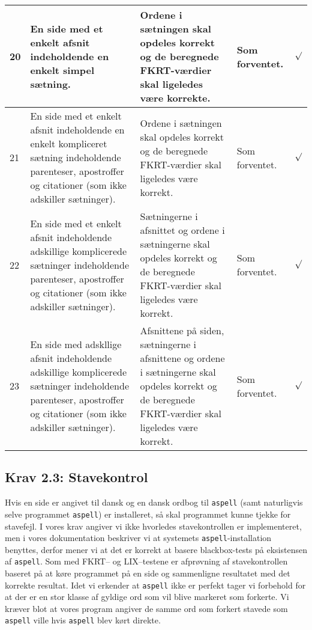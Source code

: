 \documentclass[a4paper,oneside,article]{memoir}
\begin{document}
\begin{landscape}
\begin{longtable}[c]{p{20pt}|p{220pt}|p{130pt}|p{130pt}|r}
20 & 
En side med et enkelt afsnit indeholdende en enkelt simpel sætning. &
Ordene i sætningen skal opdeles korrekt og de beregnede FKRT-værdier skal
ligeledes være korrekte. &
Som forventet. &
$\surd$ \\ \hline

21 & 
En side med et enkelt afsnit indeholdende en enkelt kompliceret
sætning indeholdende parenteser, apostroffer og citationer (som ikke
adskiller sætninger). &
Ordene i sætningen skal opdeles korrekt og de beregnede FKRT-værdier
skal ligeledes være korrekt. &
Som forventet. &
$\surd$ \\ \hline

22 &
En side med et enkelt afsnit indeholdende adskillige
komplicerede sætninger indeholdende parenteser, apostroffer og
citationer (som ikke adskiller sætninger). &
Sætningerne i afsnittet og ordene i sætningerne skal opdeles korrekt
og de beregnede FKRT-værdier skal ligeledes være korrekt. &
Som forventet. &
$\surd$ \\ \hline

23 &
En side med adskllige afsnit indeholdende adskillige
komplicerede sætninger indeholdende parenteser, apostroffer og
citationer (som ikke adskiller sætninger). &
Afsnittene på siden, sætningerne i afsnittene og ordene i sætningerne
skal opdeles korrekt og de beregnede FKRT-værdier skal ligeledes være korrekt. &
Som forventet. &
$\surd$ \\ \hline

\end{longtable}

\subsection{Krav 2.3: Stavekontrol}

Hvis en side er angivet til dansk og en dansk ordbog til
\texttt{aspell} (samt naturligvis selve programmet \texttt{aspell}) er
installeret, så skal programmet kunne tjekke for stavefejl. I vores
krav angiver vi ikke hvorledes stavekontrollen er implementeret, men i
vores dokumentation beskriver vi at systemets
\texttt{aspell}-installation benyttes, derfor mener vi at det er
korrekt at basere blackbox-tests på eksistensen af
\texttt{aspell}. Som med FKRT-- og LIX--testene er afprøvning af
stavekontrollen baseret på at køre programmet på en side og
sammenligne resultatet med det korrekte resultat. Idet vi erkender at
\texttt{aspell} ikke er perfekt tager vi forbehold for at der er en
stor klasse af gyldige ord som vil blive markeret som forkerte. Vi
kræver blot at vores program angiver de samme ord som forkert stavede
som \texttt{aspell} ville hvis \texttt{aspell} blev kørt direkte.


\end{landscape}
\end{document}
